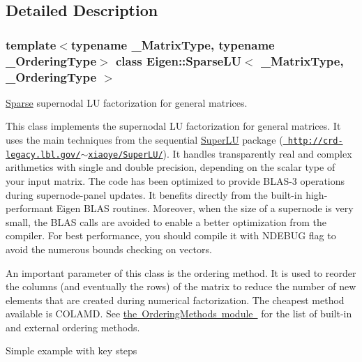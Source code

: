 \subsection{Detailed Description}
\subsubsection*{template$<$typename \+\_\+\+Matrix\+Type, typename \+\_\+\+Ordering\+Type$>$\newline
class Eigen\+::\+Sparse\+L\+U$<$ \+\_\+\+Matrix\+Type, \+\_\+\+Ordering\+Type $>$}

\mbox{\hyperlink{struct_eigen_1_1_sparse}{Sparse}} supernodal LU factorization for general matrices. 

This class implements the supernodal LU factorization for general matrices. It uses the main techniques from the sequential \mbox{\hyperlink{class_eigen_1_1_super_l_u}{Super\+LU}} package (\href{http://crd-legacy.lbl.gov/~xiaoye/SuperLU/}{\texttt{ http\+://crd-\/legacy.\+lbl.\+gov/$\sim$xiaoye/\+Super\+L\+U/}}). It handles transparently real and complex arithmetics with single and double precision, depending on the scalar type of your input matrix. The code has been optimized to provide B\+L\+A\+S-\/3 operations during supernode-\/panel updates. It benefits directly from the built-\/in high-\/performant Eigen B\+L\+AS routines. Moreover, when the size of a supernode is very small, the B\+L\+AS calls are avoided to enable a better optimization from the compiler. For best performance, you should compile it with N\+D\+E\+B\+UG flag to avoid the numerous bounds checking on vectors.

An important parameter of this class is the ordering method. It is used to reorder the columns (and eventually the rows) of the matrix to reduce the number of new elements that are created during numerical factorization. The cheapest method available is C\+O\+L\+A\+MD. See \mbox{\hyperlink{}{the Ordering\+Methods module }} for the list of built-\/in and external ordering methods.

Simple example with key steps 
\begin{DoxyCode}{0}
\DoxyCodeLine{\textcolor{comment}{// fill A and b;}}
\DoxyCodeLine{\textcolor{comment}{// Compute the ordering permutation vector from the structural pattern of A}}
\DoxyCodeLine{\textcolor{comment}{// Compute the numerical factorization }}
\DoxyCodeLine{\textcolor{comment}{//Use the factors to solve the linear system }}
\end{DoxyCode}


